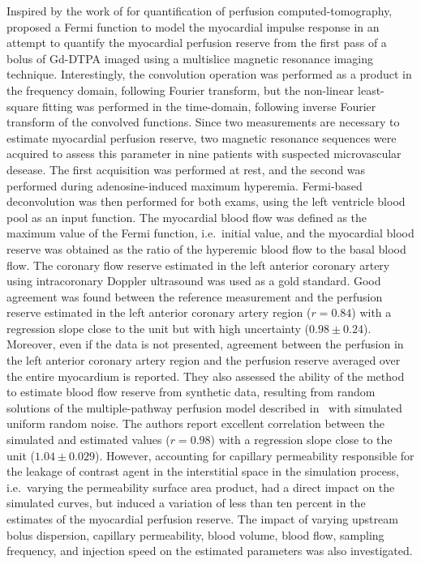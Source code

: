 Inspired by the work of \citet{Axel:1982wu} for quantification of perfusion computed-tomography, \citet{JeroschHerold:1998gg} proposed a Fermi function to model the myocardial impulse response in an attempt to quantify the myocardial perfusion reserve from the first pass of a bolus of Gd-DTPA imaged using a multislice magnetic resonance imaging technique.
Interestingly, the convolution operation was performed as a product in the frequency domain, following Fourier transform, but the non-linear least-square fitting was performed in the time-domain, following inverse Fourier transform of the convolved functions.
Since two measurements are necessary to estimate myocardial perfusion reserve, two magnetic resonance sequences were acquired to assess this parameter in nine patients with suspected microvascular desease.
The first acquisition was performed at rest, and the second was performed during adenosine-induced maximum hyperemia.
Fermi-based deconvolution was then performed for both exams, using the left ventricle blood pool as an input function.
The myocardial blood flow was defined as the maximum value of the Fermi function, i.e.~initial value, and the myocardial blood reserve was obtained as the ratio of the hyperemic blood flow to the basal blood flow.
The coronary flow reserve estimated in the left anterior coronary artery using intracoronary Doppler ultrasound was used as a gold standard. 
Good agreement was found between the reference measurement and the perfusion reserve estimated in the left anterior coronary artery region ($r = 0.84$) with a regression slope close to the unit but with high uncertainty ($0.98 \pm 0.24$).
Moreover, even if the data is not presented, agreement between the perfusion in the left anterior coronary artery region and the perfusion reserve averaged over the entire myocardium is reported.
They also assessed the ability of the method to estimate blood flow reserve from synthetic data, resulting from random solutions of the multiple-pathway perfusion model described in~\cite{Kroll:1996vz} with simulated uniform random noise. 
The authors report excellent correlation between the simulated and estimated values ($r = 0.98$) with a regression slope close to the unit ($1.04 \pm 0.029$).
However, accounting for capillary permeability responsible for the leakage of contrast agent in the interstitial space in the simulation process, i.e.~varying the permeability surface area product, had a direct impact on the simulated curves, but induced a variation of less than ten percent in the estimates of the myocardial perfusion reserve.
The impact of varying upstream bolus dispersion, capillary permeability, blood volume, blood flow, sampling frequency, and injection speed on the estimated parameters was also investigated.

